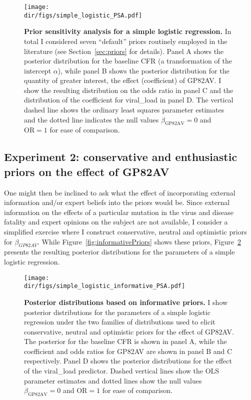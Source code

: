\begin{figure}[!ht]
  \centering
  \texttt{[image: \\dir/figs/simple\_logistic\_PSA.pdf]}
\caption[Prior sensitivity analysis for a simple logistic regression.]{\textbf{Prior sensitivity analysis for a simple logistic regression.}
In total I considered seven ``default'' priors routinely employed in the literature (see Section~\ref{sec:priors} for details).
Panel A shows the posterior distribution for the baseline CFR (a transformation of the intercept $\alpha$), while panel B shows the posterior distribution for the quantity of greater interest, the effect (coefficient) of GP82AV.
I show the resulting distribution on the odds ratio in panel C and the distribution of the coefficient for viral\_load in panel D.
The vertical dashed line shows the ordinary least squares parameter estimates and the dotted line indicates the null values $\beta_{\text{GP82AV}} = 0$ and $\text{OR} = 1$ for ease of comparison.
}
\label{fig:simpleLR}
\end{figure}

\subsection{Experiment 2: conservative and enthusiastic priors on the effect of GP82AV}
\label{sec:results-informative}

One might then be inclined to ask what the effect of incorporating external information and/or expert beliefs into the priors would be.
Since external information on the effects of a particular mutation in the virus and disease fatality and expert opinions on the subject are not available, I consider a simplified exercise where I construct conservative, neutral and optimistic priors for $\beta_{GP82AV}$.
While Figure~\ref{fig:informativePriors} shows these priors, Figure~\ref{fig:infomativePosteriors} presents the resulting posterior distributions for the parameters of a simple logistic regression.

\begin{figure}[!ht]
  \centering
  \texttt{[image: \\dir/figs/simple\_logistic\_informative\_PSA.pdf]}
\caption[Posterior distributions based on informative priors.]{\textbf{Posterior distributions based on informative priors.}
I show posterior distributions for the parameters of a simple logistic regression under the two families of distributions used to elicit conservative, neutral and optimistic priors for the effect of GP82AV.
The posterior for the baseline CFR is shown in panel A, while the coefficient and odds ratios for GP82AV are shown in panel B and C respectively.
Panel D shows the posterior distributions for the effect of the viral\_load predictor.
Dashed vertical lines show the OLS parameter estimates and dotted lines show the null values $\beta_{\text{GP82AV}} = 0$ and $\text{OR} = 1$ for ease of comparison.
}
\label{fig:infomativePosteriors}
\end{figure}

